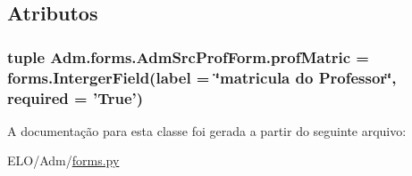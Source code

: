 \subsection{Atributos}
\hypertarget{classAdm_1_1forms_1_1AdmSrcProfForm_a774a36bf303e747a3139b988a4a714b3}{
\subsubsection[{prof\-Matric}]{\setlength{\rightskip}{0pt plus 5cm}tuple Adm.\-forms.\-Adm\-Src\-Prof\-Form.\-prof\-Matric = forms.\-Interger\-Field(label = \char`\"{}matricula do Professor\char`\"{}, required = 'True')\hspace{0.3cm}{\ttfamily [static]}}}\label{classAdm_1_1forms_1_1AdmSrcProfForm_a774a36bf303e747a3139b988a4a714b3}


A documentação para esta classe foi gerada a partir do seguinte arquivo\-:\begin{DoxyCompactItemize}
\item 
E\-L\-O/\-Adm/\hyperlink{Adm_2forms_8py}{forms.\-py}\end{DoxyCompactItemize}
